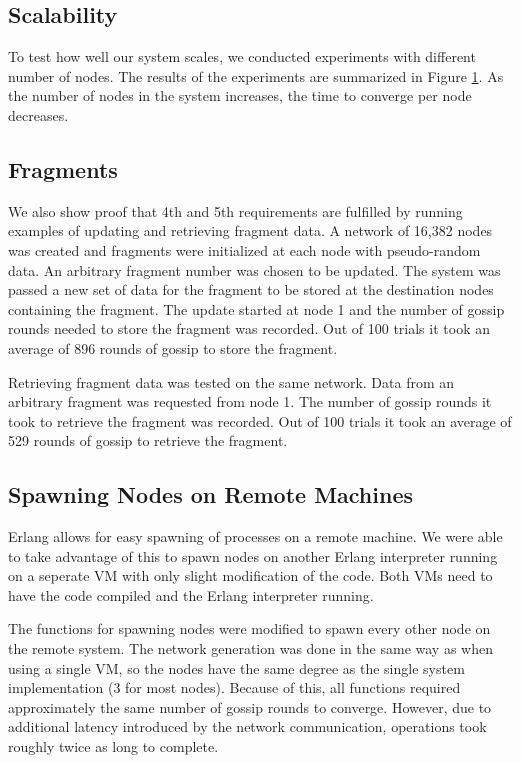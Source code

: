 \subsection{Scalability}
To test how well our system scales, we conducted experiments with different number of nodes. The results of the experiments are summarized in Figure \ref{fig:scalability}. As the number of nodes in the system increases, the time to converge per node decreases. 

\begin{figure}[ht!]
\centering
\setlength\fboxsep{0pt}
\setlength\fboxrule{0.5pt}
\caption{}
\label{fig:scalability}
\end{figure}

\subsection{Fragments}
We also show proof that 4th and 5th requirements are fulfilled by running examples of updating and retrieving fragment data. A network of 16,382 nodes was created and fragments were initialized at each node with pseudo-random data. An arbitrary fragment number was chosen to be updated. The system was passed a new set of data for the fragment to be stored at the destination nodes containing the fragment. The update started at node 1 and the number of gossip rounds needed to store the fragment was recorded. Out of 100 trials it took an average of 896 rounds of gossip to store the fragment.

Retrieving fragment data was tested on the same network. Data from an arbitrary fragment was requested from node 1. The number of gossip rounds it took to retrieve the fragment was recorded. Out of 100 trials it took an average of 529 rounds of gossip to retrieve the fragment.

\subsection{Spawning Nodes on Remote Machines}
Erlang allows for easy spawning of processes on a remote machine. We were able to take advantage of this to spawn nodes on another Erlang interpreter running on a seperate VM with only slight modification of the code. Both VMs need to have the code compiled and the Erlang interpreter running.

The functions for spawning nodes were modified to spawn every other node on the remote system. The network generation was done in the same way as when using a single VM, so the nodes have the same degree as the single system implementation (3 for most nodes). Because of this, all functions required approximately the same number of gossip rounds to converge. However, due to additional latency introduced by the network communication, operations took roughly twice as long to complete.

